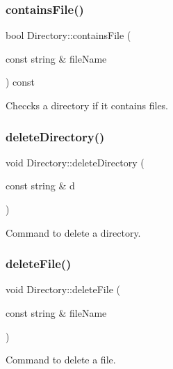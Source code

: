 \subsubsection{\texorpdfstring{contains\+File()}{containsFile()}}
{\footnotesize\ttfamily bool Directory\+::contains\+File (\begin{DoxyParamCaption}\item[{const string \&}]{file\+Name }\end{DoxyParamCaption}) const}



Checcks a directory if it contains files. 

\mbox{\label{class_directory_a8d233286b4964b8261543fa823e66f9e}} 
\subsubsection{\texorpdfstring{delete\+Directory()}{deleteDirectory()}}
{\footnotesize\ttfamily void Directory\+::delete\+Directory (\begin{DoxyParamCaption}\item[{const string \&}]{d }\end{DoxyParamCaption})}



Command to delete a directory. 

\mbox{\label{class_directory_ac5d2847c135eff94ce4fedd8099de18a}} 
\subsubsection{\texorpdfstring{delete\+File()}{deleteFile()}}
{\footnotesize\ttfamily void Directory\+::delete\+File (\begin{DoxyParamCaption}\item[{const string \&}]{file\+Name }\end{DoxyParamCaption})}



Command to delete a file. 

\mbox{\label{class_directory_ad8718bf810510f06e1932a8083ae09e2}} 
